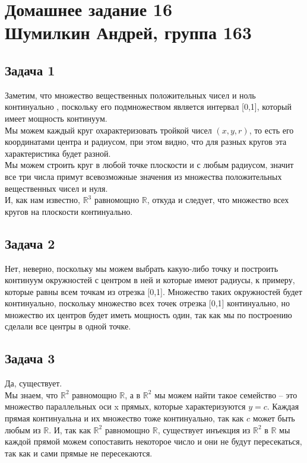 

	\section{Домашнее задание 16\\ Шумилкин Андрей, группа 163} 
	\subsection{Задача 1}
	Заметим, что множество вещественных положительных чисел и ноль континуально , поскольку его подмножеством является интервал [0,1], который имеет мощность континуум. \\
	Мы можем каждый круг охарактеризовать тройкой чисел $(x, y, r)$, то есть его координатами центра и радиусом, при этом видно, что для разных кругов эта характеристика будет разной.\\
	Мы можем строить круг в любой точке плоскости и с любым радиусом, значит все три числа примут всевозможные значения из множества положительных вещественных чисел и нуля.\\
	И, как нам известно, $\mathbb{R}^3$ равномощно $\mathbb{R}$, откуда и следует, что множество всех кругов на плоскости континуально. 
	
	\subsection{Задача 2}
	Нет, неверно, поскольку мы можем выбрать какую-либо точку и построить континуум окружностей с центром в ней и которые имеют радиусы, к примеру, которые равны всем точкам из отрезка [0,1]. Множество таких окружностей будет континуально, поскольку множество всех точек отрезка [0,1] континуально, но множество их центров будет иметь мощность один, так как мы по построению сделали все центры в одной точке.
	
	\subsection{Задача 3}
	Да, существует. \\
	Мы знаем, что $\mathbb{R}^2$ равномощно $\mathbb{R}$, а в $\mathbb{R}^2$ мы можем найти такое семейство -- это множество параллельных оси x прямых, которые характеризуются $y = c$. Каждая прямая континуальна и их множество тоже континуально, так как $c$ может быть любым из $\mathbb{R}$. И, так как $\mathbb{R}^2$ равномощно $\mathbb{R}$, существует инъекция из $\mathbb{R}^2$ в $\mathbb{R}$ мы каждой прямой можем сопоставить некоторое число и они не будут пересекаться, так как и сами прямые не пересекаются. 
	
